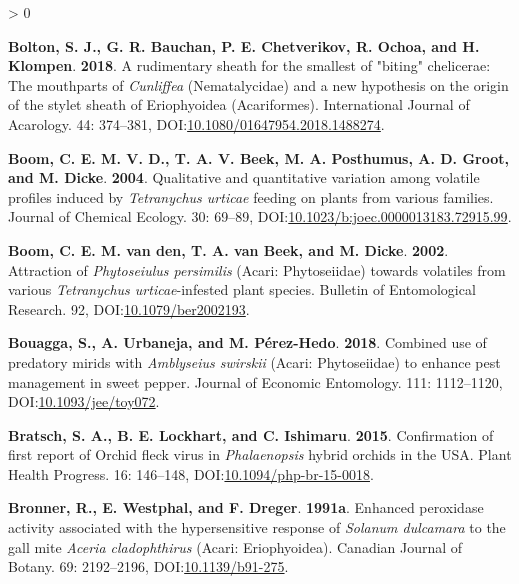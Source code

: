 \documentclass{ufdissertation}[overrideChapters] %
\newlength{\cslhangindent}
\newenvironment{CSLReferences}[2] %
 {%
  \setlength{\parindent}{0pt}
  \ifodd #1 \everypar{\setlength{\hangindent}{\cslhangindent}}\ignorespaces\fi
  \ifnum #2 > 0
  \setlength{\parskip}{#2\baselineskip}
  \fi
 }%
 {}
\begin{document}
{\begin{CSLReferences}{1}{1}
\leavevmode{}%
\textbf{Bolton, S. J., G. R. Bauchan, P. E. Chetverikov, R. Ochoa, and H. Klompen}. \textbf{2018}. A rudimentary sheath for the smallest of "biting" chelicerae: The mouthparts of {\emph{Cunliffea}} ({Nematalycidae}) and a new hypothesis on the origin of the stylet sheath of {Eriophyoidea} ({Acariformes}). International Journal of Acarology. 44: 374--381, DOI:\href{https://doi.org/10.1080/01647954.2018.1488274}{10.1080/01647954.2018.1488274}.

\leavevmode{}%
\textbf{Boom, C. E. M. V. D., T. A. V. Beek, M. A. Posthumus, A. D. Groot, and M. Dicke}. \textbf{2004}. Qualitative and quantitative variation among volatile profiles induced by {\emph{Tetranychus urticae}} feeding on plants from various families. Journal of Chemical Ecology. 30: 69--89, DOI:\href{https://doi.org/10.1023/b:joec.0000013183.72915.99}{10.1023/b:joec.0000013183.72915.99}.

\leavevmode{}%
\textbf{Boom, C. E. M. van den, T. A. van Beek, and M. Dicke}. \textbf{2002}. Attraction of {\emph{Phytoseiulus persimilis}} ({Acari}: {Phytoseiidae}) towards volatiles from various {\emph{Tetranychus urticae}}-infested plant species. Bulletin of Entomological Research. 92, DOI:\href{https://doi.org/10.1079/ber2002193}{10.1079/ber2002193}.

\leavevmode{}%
\textbf{Bouagga, S., A. Urbaneja, and M. Pérez-Hedo}. \textbf{2018}. Combined use of predatory mirids with {\emph{Amblyseius swirskii}} ({Acari}: {Phytoseiidae}) to enhance pest management in sweet pepper. Journal of Economic Entomology. 111: 1112--1120, DOI:\href{https://doi.org/10.1093/jee/toy072}{10.1093/jee/toy072}.

\leavevmode{}%
\textbf{Bratsch, S. A., B. E. Lockhart, and C. Ishimaru}. \textbf{2015}. Confirmation of first report of {Orchid fleck virus} in {\emph{Phalaenopsis}} hybrid orchids in the {USA}. Plant Health Progress. 16: 146--148, DOI:\href{https://doi.org/10.1094/php-br-15-0018}{10.1094/php-br-15-0018}.

\leavevmode{}%
\textbf{Bronner, R., E. Westphal, and F. Dreger}. \textbf{1991a}. Enhanced peroxidase activity associated with the hypersensitive response of {\emph{Solanum dulcamara}} to the gall mite {\emph{Aceria cladophthirus}} ({Acari}: {Eriophyoidea}). Canadian Journal of Botany. 69: 2192--2196, DOI:\href{https://doi.org/10.1139/b91-275}{10.1139/b91-275}.


\end{CSLReferences}}
\end{document}
